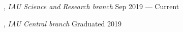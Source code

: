 
, \textit{IAU Science and Research branch}	\hfill Sep 2019 --- Current 

, \textit{IAU Central branch} \hfill	Graduated 2019

